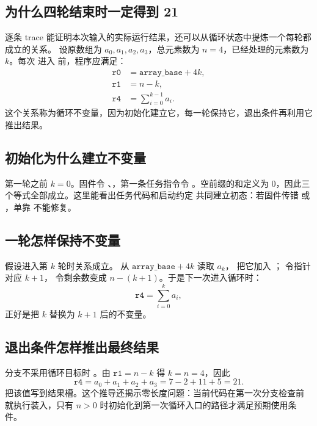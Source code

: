\subsection{为什么四轮结束时一定得到 21}

逐条 trace 能证明本次输入的实际运行结果，还可以从循环状态中提炼一个每轮都成立的关系。
设原数组为 \(a_0,a_1,a_2,a_3\)，总元素数为 \(n=4\)，已经处理的元素数为 \(k\)。每次
进入  前，程序应满足：
\[
\begin{aligned}
\texttt{r0} &= \texttt{array\_base}+4k,\\
\texttt{r1} &= n-k,\\
\texttt{r4} &= \sum_{i=0}^{k-1}a_i.
\end{aligned}
\]
这个关系称为循环不变量，因为初始化建立它，每一轮保持它，退出条件再利用它推出结果。

\subsection{初始化为什么建立不变量}

第一轮之前 \(k=0\)。固件令 、，第一条任务指令令
。空前缀的和定义为 0，因此三个等式全部成立。这里能看出任务代码和启动约定
共同建立初态：若固件传错  或 ，单靠  不能修复。

\subsection{一轮怎样保持不变量}

假设进入第 \(k\) 轮时关系成立。 从
\(\texttt{array\_base}+4k\) 读取 \(a_k\)， 把它加入 ；
 令指针对应 \(k+1\)， 令剩余数变成
\(n-(k+1)\)。于是下一次进入循环时：
\[
\texttt{r4}=\sum_{i=0}^{k}a_i,
\]
正好是把 \(k\) 替换为 \(k+1\) 后的不变量。

\subsection{退出条件怎样推出最终结果}

分支不采用循环目标时 。由 \(\texttt{r1}=n-k\) 得 \(k=n=4\)，因此
\[
\texttt{r4}=a_0+a_1+a_2+a_3=7-2+11+5=21.
\]
 把该值写到结果槽。这个推导还揭示零长度问题：当前代码在第一次分支检查前
就执行装入，只有 \(n>0\) 时初始化到第一次循环入口的路径才满足预期使用条件。

